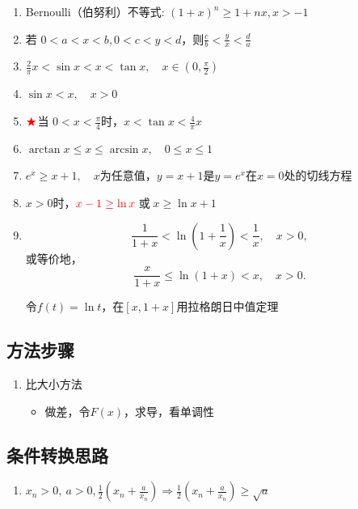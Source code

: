 \documentclass[../book.tex]{subfiles}
\begin{document}
\begin{enumerate}
        令 \( b_1 = b_2 = \cdots = b_n = 1 \)，则有
        \[
            a_1^2 + a_2^2 + \cdots + a_n^2
            \geq
            \frac{(a_1 + a_2 + \cdots + a_n)^2}{n}
        \]
        注: $\color{red}{(a_1^2 + a_2^2)(b_1^2 + b_2^2) \geq (a_{1}b_{1} + a_2 b_2)^2}$
        \item Bernoulli（伯努利）不等式: $(1+x)^n \ge 1 + nx, x > -1$
        \item 若 $0 < a < x < b, 0 < c < y < d$，则$\displaystyle\frac{c}{b} < \frac{y}{x} < \frac{d}{a}$
        \item $\displaystyle\frac{2}{\pi}x < \sin x < x < \tan x,\quad x \in \left(0,\displaystyle\frac{\pi}{2}\right)$
        \item $\sin x < x, \quad x > 0$
        \item $\color{red}{\bigstar}$当 $0 < x < \displaystyle\frac{\pi}{4}$时，$x < \tan x < \displaystyle\frac{4}{\pi}x$
        \item $\arctan x \leq x \leq \arcsin x, \quad 0 \leq x \leq 1$
        \item $e^x \geq x + 1, \quad x\text{为任意值}$，$y = x + 1$是$y = e^x$在$x = 0$处的切线方程
        \item $x > 0$时，$\color{red}{x - 1 \geq \ln x}\;$或$\;x \geq \ln x + 1$
        \item
        \[
            \frac{1}{1+x}
            <
            \ln\!\left(1+\frac{1}{x}\right)
            <
            \frac{1}{x},
            \quad x>0,
        \]
        或等价地，
        \[
            \frac{x}{1+x}
            \le
            \ln(1+x)
            <
            x,
            \quad x>0.
        \]
        \begin{analysisbox}[证明]
            令$f(t) = \ln t$，在$[x, 1+x]$用拉格朗日中值定理
        \end{analysisbox}
    \end{enumerate}

    \subsection{方法步骤}

    \begin{enumerate}
        \item 比大小方法
        \begin{itemize}
            \item 做差，令$F(x)$，求导，看单调性
        \end{itemize}

    \end{enumerate}

    \subsection{条件转换思路}

    \begin{enumerate}
        \item $x_n>0,\ a>0, \displaystyle\frac{1}{2}(x_n + \displaystyle\frac{a}{x_n}) \Rightarrow \displaystyle\frac{1}{2}(x_n + \displaystyle\frac{a}{x_n}) \geq \sqrt {a}$

    \end{enumerate}
\end{document}
